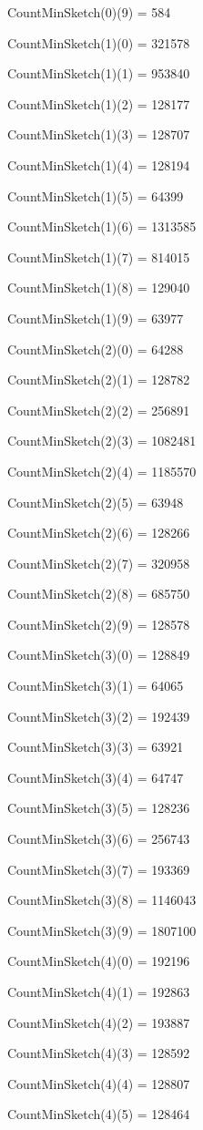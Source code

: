 \documentclass{report}
\begin{document}
CountMinSketch(0)(9) = 584

CountMinSketch(1)(0) = 321578

CountMinSketch(1)(1) = 953840

CountMinSketch(1)(2) = 128177

CountMinSketch(1)(3) = 128707

CountMinSketch(1)(4) = 128194

CountMinSketch(1)(5) = 64399

CountMinSketch(1)(6) = 1313585

CountMinSketch(1)(7) = 814015

CountMinSketch(1)(8) = 129040

CountMinSketch(1)(9) = 63977

CountMinSketch(2)(0) = 64288

CountMinSketch(2)(1) = 128782

CountMinSketch(2)(2) = 256891

CountMinSketch(2)(3) = 1082481

CountMinSketch(2)(4) = 1185570

CountMinSketch(2)(5) = 63948

CountMinSketch(2)(6) = 128266

CountMinSketch(2)(7) = 320958

CountMinSketch(2)(8) = 685750

CountMinSketch(2)(9) = 128578

CountMinSketch(3)(0) = 128849

CountMinSketch(3)(1) = 64065

CountMinSketch(3)(2) = 192439

CountMinSketch(3)(3) = 63921

CountMinSketch(3)(4) = 64747

CountMinSketch(3)(5) = 128236

CountMinSketch(3)(6) = 256743

CountMinSketch(3)(7) = 193369

CountMinSketch(3)(8) = 1146043

CountMinSketch(3)(9) = 1807100

CountMinSketch(4)(0) = 192196

CountMinSketch(4)(1) = 192863

CountMinSketch(4)(2) = 193887

CountMinSketch(4)(3) = 128592

CountMinSketch(4)(4) = 128807

CountMinSketch(4)(5) = 128464
\end{document}
